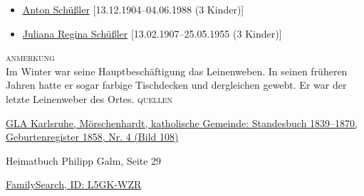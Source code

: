 \begin{person}[
    surname = {Schüßler},
    givenname = {Johann Georg},
    suffix = {1858--1937},
    label = {@I150@},
    filename = {Johann Schuessler (1858)}
    ]
\begin{itemize}
\item \hyperref[@I175@]{Anton Schüßler} [13.12.1904--04.06.1988 (3 Kinder)]
\item \hyperref[@I179@]{Juliana Regina Schüßler} [13.02.1907--25.05.1955 (3 Kinder)]
\end{itemize}
\medbreak
\textsc{anmerkung}\\
Im Winter war seine Hauptbeschäftigung das Leinenweben. In seinen früheren Jahren hatte er sogar farbige Tischdecken und dergleichen gewebt. Er war der letzte Leinenweber des Ortes.
\medbreak
\textsc{{quellen}}
\begin{enumerate}[label={[\arabic*]}]
\item \href{http://www.landesarchiv-bw.de/plink/?f=4-1119442-108}{GLA Karlsruhe, Mörschenhardt, katholische Gemeinde: Standesbuch 1839–1870, Geburtenregister 1858, Nr. 4 (Bild 108)}
\item Heimatbuch Philipp Galm, Seite 29
\item \href{https://www.familysearch.org/tree/person/details/L5GK-WZR}{FamilySearch, ID: L5GK-WZR}
\end{enumerate}

\end{person}

